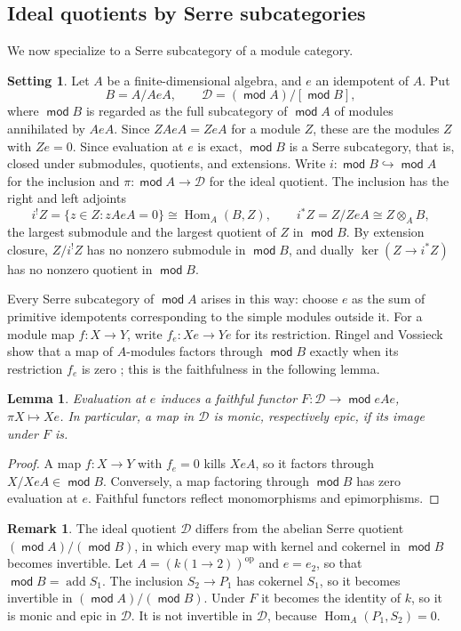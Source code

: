 \documentclass[a4paper,reqno,10pt]{amsart}
\newtheorem{lemma}[theorem]{Lemma}
\theoremstyle{definition}
\newtheorem{setting}[theorem]{Setting}
\newtheorem{remark}[theorem]{Remark}
\numberwithin{equation}{section}
\DeclareMathOperator{\moduleCategory}{\mathsf{mod}}
\renewcommand{\mod}{\moduleCategory}
\DeclareMathOperator{\add}{add}
\DeclareMathOperator{\Hom}{Hom}
\newcommand{\op}{\mathrm{op}}
\newcommand{\cD}{\mathcal D}
\begin{document}
\subsection{Ideal quotients by Serre subcategories}
We now specialize to a Serre subcategory of a module category.
\begin{setting}\label{set:serre}
Let \(A\) be a finite-dimensional algebra, and \(e\)
an idempotent of \(A\). Put
\[
 B=A/AeA,\qquad \cD=(\mod A)/[\mod B],
\]
where \(\mod B\) is regarded as the full subcategory of \(\mod A\) of
modules annihilated by \(AeA\). Since \(ZAeA=ZeA\) for a module \(Z\),
these are the modules \(Z\) with \(Ze=0\). Since evaluation at \(e\) is
exact, \(\mod B\) is a Serre subcategory, that is, closed under
submodules, quotients, and extensions. Write
\(i:\mod B\hookrightarrow\mod A\) for the inclusion and
\(\pi:\mod A\to\cD\) for the ideal quotient. The
inclusion has the right and left adjoints
\[
 i^!Z=\{z\in Z:zAeA=0\}\cong\Hom_A(B,Z),\qquad
 i^*Z=Z/ZeA\cong Z\otimes_AB,
\]
the largest submodule and the largest quotient of \(Z\) in \(\mod B\).
By extension closure, \(Z/i^!Z\) has no nonzero submodule in \(\mod B\), and
dually \(\ker(Z\to i^*Z)\) has no nonzero quotient in \(\mod B\).
\end{setting}
Every Serre subcategory of \(\mod A\) arises in this way: choose \(e\) as
the sum of primitive idempotents corresponding to the simple modules
outside it. For a module map \(f:X\to Y\), write \(f_e:Xe\to Ye\) for its
restriction. Ringel and Vossieck show that a map of \(A\)-modules factors
through \(\mod B\) exactly when its restriction \(f_e\) is zero
\cite[Section~10, Lemma~1]{RV}; this is the faithfulness in the following
lemma.

\begin{lemma}\label{lem:quotient-evaluation}
Evaluation at \(e\) induces a faithful functor
\(F:\cD\to\mod eAe\), \(\pi X\mapsto Xe\). In particular, a map in \(\cD\)
is monic, respectively epic, if its image under \(F\) is.
\end{lemma}
\begin{proof}
A map \(f:X\to Y\) with \(f_e=0\) kills \(XeA\), so it factors through
\(X/XeA\in\mod B\). Conversely, a map factoring through \(\mod B\) has zero
evaluation at \(e\). Faithful functors reflect monomorphisms and
epimorphisms.
\end{proof}

\begin{remark}\label{ex:a2-quotients}
The ideal quotient \(\cD\) differs from the abelian Serre quotient
\((\mod A)/(\mod B)\), in which every map with kernel and cokernel in \(\mod B\)
becomes invertible. Let \(A=(k(1\to2))^{\op}\) and \(e=e_2\), so that
\(\mod B=\add S_1\). The inclusion \(S_2\to P_1\) has cokernel \(S_1\), so it
becomes invertible in \((\mod A)/(\mod B)\). Under \(F\) it becomes the
identity of \(k\), so it is monic and epic in \(\cD\). It is not invertible
in \(\cD\), because \(\Hom_A(P_1,S_2)=0\).
\end{remark}
\end{document}
